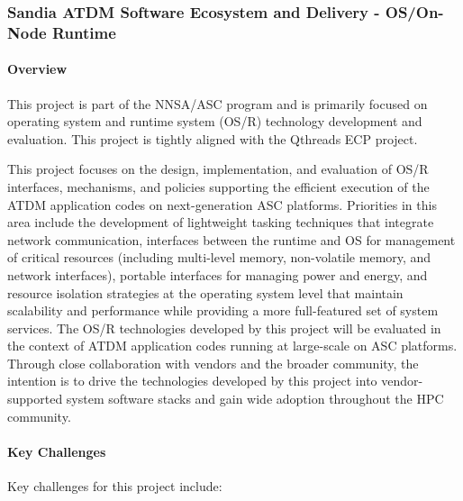\subsubsection{Sandia ATDM Software Ecosystem and Delivery -
  OS/On-Node Runtime} 

\paragraph{Overview} 

This project is part of the NNSA/ASC program and is primarily focused
on operating system and runtime system (OS/R) technology
development and evaluation. This project is tightly aligned with the
Qthreads ECP project.

This project focuses on the design, implementation, and evaluation of
OS/R interfaces, mechanisms, and policies supporting the efficient
execution of the ATDM application codes on next-generation ASC
platforms. Priorities in this area include the development of
lightweight tasking techniques that integrate network communication,
interfaces between the runtime and OS for management of critical
resources (including multi-level memory, non-volatile memory, and
network interfaces), portable interfaces for managing power and
energy, and resource isolation strategies at the operating system
level that maintain scalability and performance while providing a more
full-featured set of system services. The OS/R technologies developed
by this project will be evaluated in the context of ATDM application
codes running at large-scale on ASC platforms. Through close
collaboration with vendors and the broader community, the intention is
to drive the technologies developed by this project into
vendor-supported system software stacks and gain wide adoption
throughout the HPC community.

\paragraph{Key  Challenges}

Key challenges for this project include:

